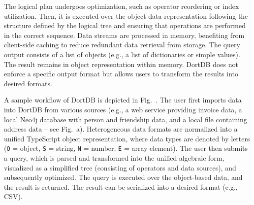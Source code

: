 
The logical plan undergoes optimization, such as %
operator reordering or index utilization. %
%
%
%
Then, it is executed over the object data representation following the structure defined by the logical tree and ensuring that operations are performed in the correct sequence. Data streams are processed in memory, benefiting from client-side caching to reduce redundant data retrieval from storage. The query output consists of a list of objects (e.g., a list of dictionaries or simple values). The result remains in object representation within memory. DortDB does not enforce a specific output format but allows users to transform the results into desired formats.

\begin{example}
A sample workflow of DortDB is depicted in Fig.~. The user first imports data into DortDB from various sources (e.g., a web service providing invoice data, a local Neo4j database with person and friendship data, and a local file containing address data -- see Fig.~a). Heterogeneous data formats are normalized into a unified TypeScript object representation, where data types are denoted by letters (\texttt{O} = object, \texttt{S} = string, \texttt{N} = number, \texttt{E} = array element). %
The user then submits a query, which is parsed and transformed into the unified algebraic form, visualized as a simplified tree (consisting of operators and data sources), and subsequently optimized. The query is executed over the object-based data, and the result is returned. The result can be serialized into a desired format (e.g., CSV).
\end{example}


